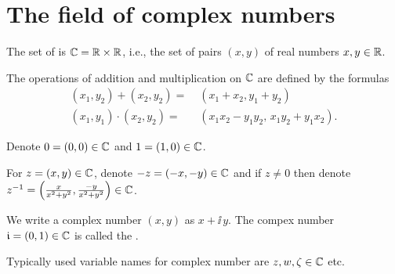 \section{The field of complex numbers}

\begin{definition}
  \label{def:complex_numbers}

  The set of  is $\mathbb{C} = \mathbb{R} \times \mathbb{R}$, i.e.,
  the set of pairs $(x,y)$ of real numbers $x,y \in \mathbb{R}$.

  The operations of addition and multiplication on $\mathbb{C}$ are defined by the formulas
  \begin{align*}
    (x_1,y_2) + (x_2,y_2) = \; & (x_1+x_2, y_1+y_2) \\
    (x_1,y_1) \cdot (x_2,y_2) = \; & (x_1 x_2 - y_1 y_2 , \, x_1 y_2 + y_1 x_2) .
  \end{align*}

  Denote
  $0 = (0,0) \in \mathbb{C}$ and $1 = (1,0) \in \mathbb{C}$.

  For $z = (x,y) \in \mathbb{C}$, denote
  $-z %
    = (-x,-y) \in \bC$ and if $z \ne 0$ then denote
  $z^{-1} %
            = \Big(\frac{x}{x^2 + y^2} , \frac{-y}{x^2 + y^2} \Big) \in \bC$.

  We write a complex number $(x,y)$ as $x + \ii \, y$.
  The compex number $\mathfrak{i} = (0,1) \in \mathbb{C}$ is called the .
  \end{definition}

Typically used variable names for complex number are $z,w,\zeta \in \mathbb{C}$ etc.


